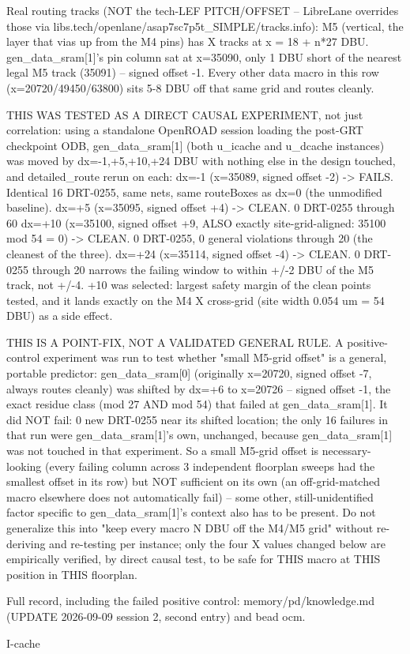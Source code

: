 \begin{record}
\begin{textblock}
Real routing tracks (NOT the tech-LEF PITCH/OFFSET -- LibreLane overrides those via
libs.tech/openlane/asap7sc7p5t_SIMPLE/tracks.info): M5 (vertical, the layer that
vias up from the M4 pins) has X tracks at x = 18 + n*27 DBU. gen_data_sram[1]'s pin
column sat at x=35090, only 1 DBU short of the nearest legal M5 track (35091) --
signed offset -1. Every other data macro in this row (x=20720/49450/63800) sits
5-8 DBU off that same grid and routes cleanly.

THIS WAS TESTED AS A DIRECT CAUSAL EXPERIMENT, not just correlation: using a
standalone OpenROAD session loading the post-GRT checkpoint ODB, gen_data_sram[1]
(both u_icache and u_dcache instances) was moved by dx=-1,+5,+10,+24 DBU with
nothing else in the design touched, and detailed_route rerun on each:
  dx=-1  (x=35089, signed offset -2) -> FAILS.  Identical 16 DRT-0255, same nets,
                                         same routeBoxes as dx=0 (the unmodified
                                         baseline).
  dx=+5  (x=35095, signed offset +4) -> CLEAN. 0 DRT-0255 through 60%
  dx=+10 (x=35100, signed offset +9, ALSO exactly site-grid-aligned: 35100 mod 54
          = 0) -> CLEAN. 0 DRT-0255, 0 general violations through 20%
          (the cleanest of the three).
  dx=+24 (x=35114, signed offset -4) -> CLEAN. 0 DRT-0255 through 20%
          narrows the failing window to within +/-2 DBU of the M5 track, not +/-4.
+10 was selected: largest safety margin of the clean points tested, and it lands
exactly on the M4 X cross-grid (site width 0.054 um = 54 DBU) as a side effect.

THIS IS A POINT-FIX, NOT A VALIDATED GENERAL RULE. A positive-control experiment
was run to test whether "small M5-grid offset" is a general, portable predictor:
gen_data_sram[0] (originally x=20720, signed offset -7, always routes cleanly) was
shifted by dx=+6 to x=20726 -- signed offset -1, the exact residue class (mod 27
AND mod 54) that failed at gen_data_sram[1]. It did NOT fail: 0 new DRT-0255 near
its shifted location; the only 16 failures in that run were gen_data_sram[1]'s own,
unchanged, because gen_data_sram[1] was not touched in that experiment. So a small
M5-grid offset is necessary-looking (every failing column across 3 independent
floorplan sweeps had the smallest offset in its row) but NOT sufficient on its own
(an off-grid-matched macro elsewhere does not automatically fail) -- some other,
still-unidentified factor specific to gen_data_sram[1]'s context also has to be
present. Do not generalize this into "keep every macro N DBU off the M4/M5 grid"
without re-deriving and re-testing per instance; only the four X values changed
below are empirically verified, by direct causal test, to be safe for THIS macro
at THIS position in THIS floorplan.

Full record, including the failed positive control: memory/pd/knowledge.md
(UPDATE 2026-09-09 session 2, second entry) and bead ocm.


I-cache
\end{textblock}

\end{record}

